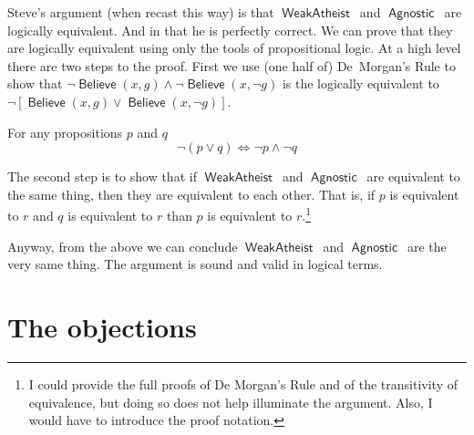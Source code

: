 \documentclass[12pt]{article}
\providecommand{\land}{\wedge}
\providecommand{\lor}{\vee}
\providecommand{\liff}{\iff}
\providecommand{\lnot}{\neg}
\newcommand{\rel}[1]{\ensuremath{\mathop{\mathsf{#1}}}}
\newcommand{\rlbelieve}{\rel{Believe}}
\newcommand{\rlwa}{\rel{WeakAtheist}}
\newcommand{\rlagno}{\rel{Agnostic}}
\begin{document}
Steve's argument (when recast this way) is that \rlwa\ and \rlagno\ are logically equivalent.
And in that he is perfectly correct. We can prove that they are logically equivalent using only the tools of propositional logic.
At a high level there are two steps to the proof. First we use (one half of) De~Morgan's Rule to show that $\lnot \rlbelieve(x, g) \land \lnot\rlbelieve(x, \lnot g)$ is the logically equivalent to $\lnot\left[\rlbelieve(x, g) \lor \rlbelieve(x, \lnot g)\right]$.

\begin{theorem}
    For any propositions $p$ and $q$ 
    \[
        \lnot\left(p \lor q\right) \liff \lnot p \land \lnot q
    \]  
\end{theorem}


The second step is to show that if \rlwa\ and \rlagno\ are equivalent to the same thing, then they are equivalent to each other. That is, if $p$ is equivalent to $r$ and $q$ is equivalent to $r$ than $p$ is equivalent to $r$.\footnote{I could provide the full proofs of De Morgan's Rule and of the transitivity of equivalence, but doing so does not help illuminate the argument. Also, I would have to introduce the proof notation.}

Anyway, from the above we can conclude \rlwa\ and \rlagno\ are the very same thing. The argument is sound and valid in logical terms.

\section{The objections}

\end{document}
